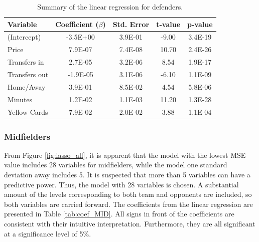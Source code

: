 \begin{table}[H]
\centering
\begin{tabular}{|l|c|c|c|c|}
\hline
Variable      & Coefficient ($\beta$) & Std. Error & t-value & p-value \\ \hline
(Intercept)   & -3.5E+00     & 3.9E-01    & -9.00    & 3.4E-19 \\
Price          & 7.9E-07      & 7.4E-08    & 10.70    & 2.4E-26 \\
Transfers in  & 2.7E-05      & 3.2E-06    & 8.54     & 1.9E-17 \\
Transfers out & -1.9E-05     & 3.1E-06    & -6.10    & 1.1E-09 \\
Home/Away     & 3.9E-01      & 8.5E-02    & 4.54     & 5.8E-06 \\
Minutes       & 1.2E-02      & 1.1E-03    & 11.20    & 1.3E-28 \\
Yellow Cards  & 7.9E-02      & 2.0E-02    & 3.88     & 1.1E-04 \\
\hline
\end{tabular}
\caption{Summary of the linear regression for defenders.}
\label{tab:coef_DEF}
\end{table}


\subsubsection{Midfielders}
From Figure \ref{fig:lasso_all}, it is apparent that the model with the lowest MSE value includes 28 variables for midfielders, while the model one standard deviation away includes 5. It is suspected that more than 5 variables can have a predictive power. Thus, the model with 28 variables is chosen. A substantial amount of the levels corresponding to both team and opponents are included, so both variables are carried forward. The coefficients from the linear regression are presented in Table \ref{tab:coef_MID}. All signs in front of the coefficients are consistent with their intuitive interpretation. Furthermore, they are all significant at a significance level of 5\%.

